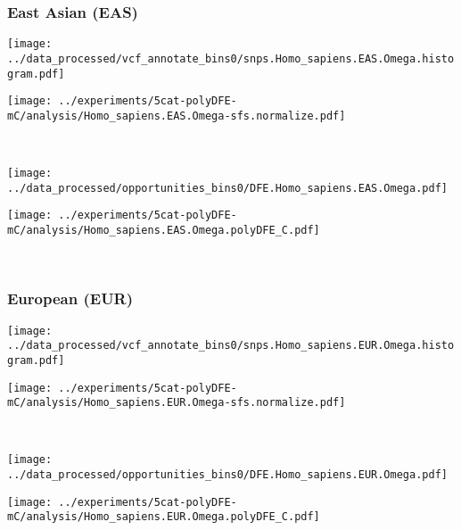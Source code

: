 \subsubsection{East Asian (EAS)}

\begin{minipage}{0.49\linewidth}
    \texttt{[image: ../data\_processed/vcf\_annotate\_bins0/snps.Homo\_sapiens.EAS.Omega.histogram.pdf]}
\end{minipage}
\begin{minipage}{0.49\linewidth}
    \texttt{[image: ../experiments/5cat-polyDFE-mC/analysis/Homo\_sapiens.EAS.Omega-sfs.normalize.pdf]}
\end{minipage}
\\
\begin{minipage}{0.49\linewidth}
    \texttt{[image: ../data\_processed/opportunities\_bins0/DFE.Homo\_sapiens.EAS.Omega.pdf]}
\end{minipage}
\begin{minipage}{0.49\linewidth}
    \texttt{[image: ../experiments/5cat-polyDFE-mC/analysis/Homo\_sapiens.EAS.Omega.polyDFE\_C.pdf]}
\end{minipage}
\\

\subsubsection{European (EUR)}

\begin{minipage}{0.49\linewidth}
    \texttt{[image: ../data\_processed/vcf\_annotate\_bins0/snps.Homo\_sapiens.EUR.Omega.histogram.pdf]}
\end{minipage}
\begin{minipage}{0.49\linewidth}
    \texttt{[image: ../experiments/5cat-polyDFE-mC/analysis/Homo\_sapiens.EUR.Omega-sfs.normalize.pdf]}
\end{minipage}
\\
\begin{minipage}{0.49\linewidth}
    \texttt{[image: ../data\_processed/opportunities\_bins0/DFE.Homo\_sapiens.EUR.Omega.pdf]}
\end{minipage}
\begin{minipage}{0.49\linewidth}
    \texttt{[image: ../experiments/5cat-polyDFE-mC/analysis/Homo\_sapiens.EUR.Omega.polyDFE\_C.pdf]}
\end{minipage}
\\

